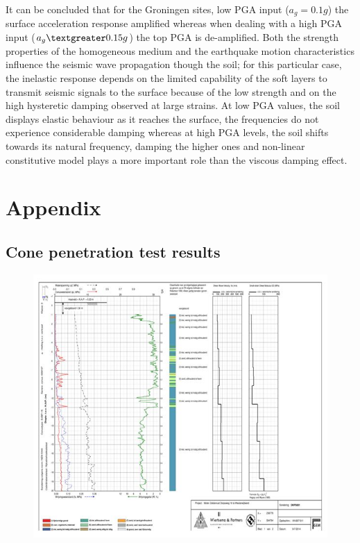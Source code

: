 \documentclass[10pt,a4paper]{report}
\begin{document}
It can be concluded that for the Groningen sites, low PGA input ($a_g=0.1g$) the surface acceleration response amplified whereas when dealing with a high PGA input ($a_g\textgreater0.15g$) the top PGA is de-amplified. Both the strength properties of the homogeneous medium and the earthquake motion characteristics influence the seismic wave propagation though the soil; for this particular case, the inelastic response depends on the limited capability of the soft layers to transmit seismic signals to the surface because of the low strength and on the high hysteretic damping observed at large strains. At low PGA values, the soil displays elastic behaviour as it reaches the surface, the frequencies do not experience considerable damping whereas at high PGA levels, the soil shifts towards its natural frequency, damping the higher ones and non-linear constitutive model plays a more important role than the viscous damping effect.

\newpage
\appendix
{}
\part{Appendix}
\chapter{Cone penetration test results} \label{App:AppendixA}

\begin{figure}[h!]
	\centering
	\includegraphics[width=0.85\linewidth]{"cpt"}
\end{figure}
\end{document}
